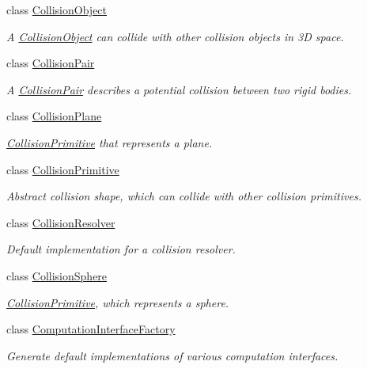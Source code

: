 \begin{DoxyCompactItemize}
class \mbox{\hyperlink{classr3_1_1_collision_object}{Collision\+Object}}
\begin{DoxyCompactList}\small\item\em A \mbox{\hyperlink{classr3_1_1_collision_object}{Collision\+Object}} can collide with other collision objects in 3D space. \end{DoxyCompactList}\item 
class \mbox{\hyperlink{classr3_1_1_collision_pair}{Collision\+Pair}}
\begin{DoxyCompactList}\small\item\em A \mbox{\hyperlink{classr3_1_1_collision_pair}{Collision\+Pair}} describes a potential collision between two rigid bodies. \end{DoxyCompactList}\item 
class \mbox{\hyperlink{classr3_1_1_collision_plane}{Collision\+Plane}}
\begin{DoxyCompactList}\small\item\em \mbox{\hyperlink{classr3_1_1_collision_primitive}{Collision\+Primitive}} that represents a plane. \end{DoxyCompactList}\item 
class \mbox{\hyperlink{classr3_1_1_collision_primitive}{Collision\+Primitive}}
\begin{DoxyCompactList}\small\item\em Abstract collision shape, which can collide with other collision primitives. \end{DoxyCompactList}\item 
class \mbox{\hyperlink{classr3_1_1_collision_resolver}{Collision\+Resolver}}
\begin{DoxyCompactList}\small\item\em Default implementation for a collision resolver. \end{DoxyCompactList}\item 
class \mbox{\hyperlink{classr3_1_1_collision_sphere}{Collision\+Sphere}}
\begin{DoxyCompactList}\small\item\em \mbox{\hyperlink{classr3_1_1_collision_primitive}{Collision\+Primitive}}, which represents a sphere. \end{DoxyCompactList}\item 
class \mbox{\hyperlink{classr3_1_1_computation_interface_factory}{Computation\+Interface\+Factory}}
\begin{DoxyCompactList}\small\item\em Generate default implementations of various computation interfaces. \end{DoxyCompactList}\item 

\end{DoxyCompactItemize}
